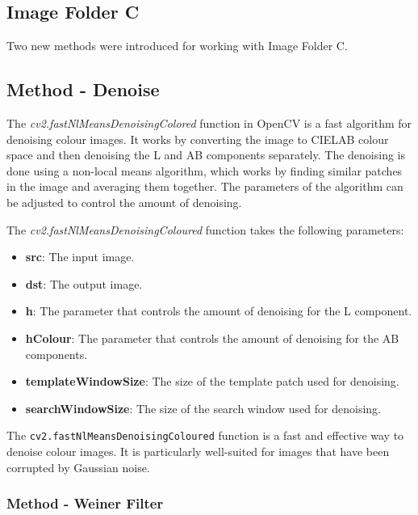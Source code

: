\newpage

\subsection{Image Folder C}

Two new methods were introduced for working with Image Folder C.

\subsection*{Method - Denoise}

The \textit{cv2.fastNlMeansDenoisingColored} function in OpenCV is a fast algorithm for denoising colour images. It works by converting the image to CIELAB colour space and then denoising the L and AB components separately. The denoising is done using a non-local means algorithm, which works by finding similar patches in the image and averaging them together. The parameters of the algorithm can be adjusted to control the amount of denoising. \cite{OpenCVDenoising}

The \textit{cv2.fastNlMeansDenoisingColoured} function takes the following parameters:


\begin{itemize}
    \item \textbf{src}: The input image.
    \item \textbf{dst}: The output image.
    \item \textbf{h}: The parameter that controls the amount of denoising for the L component.
    \item \textbf{hColour}: The parameter that controls the amount of denoising for the AB components.
    \item \textbf{templateWindowSize}: The size of the template patch used for denoising.
    \item \textbf{searchWindowSize}: The size of the search window used for denoising.
\end{itemize}

The \texttt{cv2.fastNlMeansDenoisingColoured} function is a fast and effective way to denoise colour images. It is particularly well-suited for images that have been corrupted by Gaussian noise.\cite{OpenCVDenoising}

\subsubsection*{Method - Weiner Filter}

